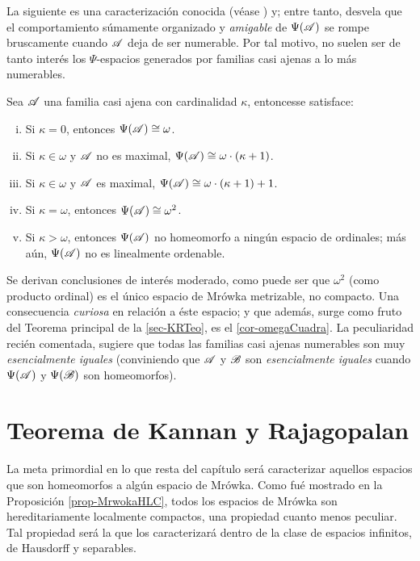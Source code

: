 	La siguiente es una caracterización conocida (véase \cite[p.~39,45]{GeorginaTesis}) y; entre tanto, desvela que el comportamiento súmamente organizado y \textit{amigable} de $\Psi(\mathscr{A})$ se rompe bruscamente cuando $\mathscr{A}$ deja de ser numerable. Por tal motivo, no suelen ser de tanto interés los $\Psi$-espacios generados por familias casi ajenas a lo más numerables.

	\begin{proposicion}\label{prop-alomasNumCaract}
		Sea $\mathscr{A}$ una familia casi ajena con cardinalidad $\kappa$, entonces\footnotemark se satisface:
		\begin{enumerate}[i)]
			\item Si $\kappa=0$, entonces $\Psi(\mathscr{A}) \cong \omega$.
			\item Si $\kappa \in \omega$ y $\mathscr{A}$ no es maximal, $\Psi(\mathscr{A}) \cong \omega \cdot (\kappa+1)$.
			\item Si $\kappa \in \omega$ y $\mathscr{A}$ es maximal, $\Psi(\mathscr{A}) \cong \omega \cdot (\kappa+1)+1$.
			\item Si $\kappa=\omega$, entonces $\Psi(\mathscr{A}) \cong \omega^2$.
			\item Si $\kappa>\omega$, entonces $\Psi(\mathscr{A})$ no homeomorfo a ningún espacio de ordinales; más aún, $\Psi(\mathscr{A})$ no es linealmente ordenable.
		\end{enumerate}
	\end{proposicion}

	
	Se derivan conclusiones de interés moderado, como puede ser que $\omega^2$ (como producto ordinal) es el único espacio de Mrówka metrizable, no compacto. Una consecuencia \textit{curiosa} en relación a éste espacio; y que además, surge como fruto del Teorema principal de la \autoref{sec-KRTeo}, es el \autoref{cor-omegaCuadra}.
	\label{Dif-esencial}
	La peculiaridad recién comentada, sugiere que todas las familias casi ajenas numerables son muy \textit{esencialmente iguales} (conviniendo que $\mathscr{A}$ y $\mathscr{B}$ son \textit{esencialmente iguales} cuando $\Psi(\mathscr{A})$ y $\Psi(\mathscr{B})$ son homeomorfos).

	\section{Teorema de Kannan y Rajagopalan}
	\label{sec-KRTeo}
	La meta primordial en lo que resta del capítulo será caracterizar aquellos espacios que son homeomorfos a algún espacio de Mrówka. Como fué mostrado en la Proposición \ref{prop-MrwokaHLC}, todos los espacios de Mrówka son hereditariamente localmente compactos, una propiedad cuanto menos peculiar. Tal propiedad será la que los caracterizará dentro de la clase de espacios infinitos, de Hausdorff y separables.	
	
